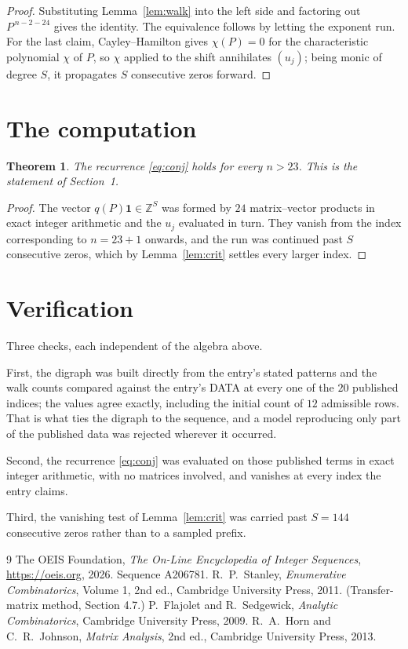 \documentclass[11pt,a4paper]{article}
\theoremstyle{plain}
\newtheorem{theorem}{Theorem}
\theoremstyle{definition}
\begin{document}
\begin{proof}
Substituting Lemma~\ref{lem:walk} into the left side and factoring out
$P^{\,n-2-24}$ gives the identity. The equivalence follows by letting the exponent
run. For the last claim, Cayley--Hamilton gives $\chi(P)=0$ for the characteristic
polynomial $\chi$ of $P$, so $\chi$ applied to the shift annihilates $(u_j)$; being monic of
degree $S$, it propagates $S$ consecutive zeros forward.
\end{proof}

\section{The computation}

\begin{theorem}
The recurrence \eqref{eq:conj} holds for every $n>23$. This is the statement of
Section~1.
\end{theorem}

\begin{proof}
The vector $q(P)\mathbf{1}\in\mathbb{Z}^{S}$ was formed by $24$ matrix--vector
products in exact integer arithmetic and the $u_j$ evaluated in turn. They vanish from the
index corresponding to $n=23+1$ onwards, and the run was continued past $S$ consecutive
zeros, which by Lemma~\ref{lem:crit} settles every larger index.
\end{proof}

\section{Verification}

Three checks, each independent of the algebra above.

First, the digraph was built directly from the entry's stated patterns and the walk counts
compared against the entry's DATA at every one of the $20$ published indices; the
values agree exactly, including the initial count of $12$ admissible rows. That is
what ties the digraph to the sequence, and a model reproducing only part of the published
data was rejected wherever it occurred.

Second, the recurrence \eqref{eq:conj} was evaluated on those published terms in exact
integer arithmetic, with no matrices involved, and vanishes at every index the entry claims.

Third, the vanishing test of Lemma~\ref{lem:crit} was carried past $S=144$ consecutive
zeros rather than to a sampled prefix.

\begin{thebibliography}{9}
 The OEIS Foundation, \emph{The On-Line Encyclopedia of Integer
Sequences}, \url{https://oeis.org}, 2026. Sequence A206781.
 R.~P.~Stanley, \emph{Enumerative Combinatorics}, Volume 1, 2nd ed.,
Cambridge University Press, 2011. (Transfer-matrix method, Section 4.7.)
 P.~Flajolet and R.~Sedgewick, \emph{Analytic Combinatorics}, Cambridge
University Press, 2009.
 R.~A.~Horn and C.~R.~Johnson, \emph{Matrix Analysis}, 2nd ed., Cambridge
University Press, 2013.
\end{thebibliography}
\end{document}
